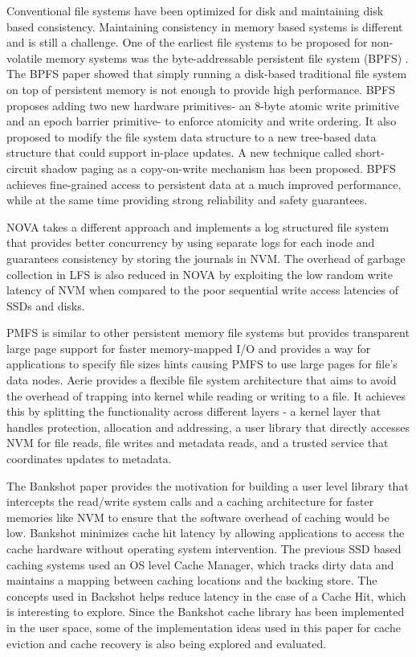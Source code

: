 \documentclass[letterpaper, 10 pt, conference]{ieeeconf}  %
\begin{document}
Conventional file systems have been optimized for disk and maintaining disk based consistency. Maintaining consistency in memory based systems is different and is still a challenge. One of the earliest file systems to be proposed for non-volatile memory systems was the byte-addressable persistent file system (BPFS) \cite{c10}. The BPFS paper showed that simply running a disk-based traditional file system on top of persistent memory is not enough to provide high performance. BPFS proposes adding two new hardware primitives- an 8-byte atomic write primitive and an epoch barrier primitive- to enforce atomicity and write ordering. It also proposed to modify the file system data structure to a new tree-based data structure that could support in-place updates. A new technique called short-circuit shadow paging as a copy-on-write mechanism has been proposed. BPFS achieves fine-grained access to persistent data at a much improved performance, while at the same time providing strong reliability and safety guarantees. 

NOVA \cite{c8} takes a different approach and implements a log structured file system that provides better concurrency by using separate logs for each inode and guarantees consistency by storing the journals in NVM. The overhead of garbage collection in LFS is also reduced in NOVA by exploiting the low random write latency of NVM when compared to the poor sequential write access latencies of SSDs and disks.

PMFS \cite{c3} is similar to other persistent memory file systems but provides transparent large page support for faster memory-mapped I/O and provides a way for applications to specify file sizes hints causing PMFS to use large pages for file’s data nodes. Aerie \cite{c5} provides a flexible file system architecture that aims to avoid the overhead of trapping into kernel while reading or writing to a file. It achieves this by splitting the functionality across different layers - a kernel layer that handles protection, allocation and addressing, a user library that directly accesses NVM for file reads, file writes and metadata reads, and a trusted service that coordinates updates to metadata.  

The Bankshot paper\cite{c7} provides the motivation for building a user level library that intercepts the read/write system calls and a caching architecture for faster memories like NVM to ensure that the software overhead of caching would be low. Bankshot minimizes cache hit latency by allowing applications to access the cache hardware without operating system intervention. The previous SSD based caching systems used an OS level Cache Manager, which tracks dirty data and maintains a mapping between caching locations and the backing store. The concepts used in Backshot helps reduce latency in the case of a Cache Hit, which is interesting to explore. Since the Bankshot cache library has been implemented in the user space, some of the implementation ideas used in this paper for cache eviction and cache recovery is also being explored and evaluated. 
 
\end{document}
